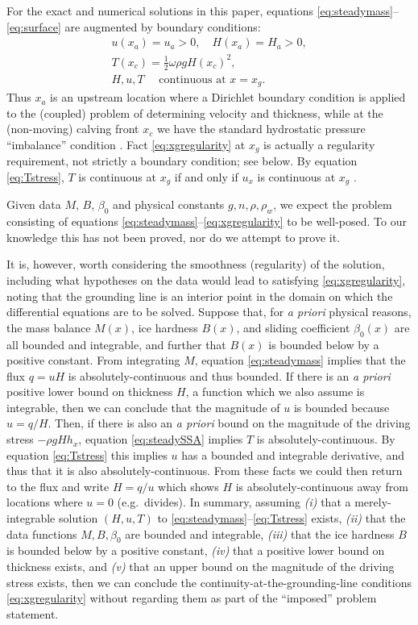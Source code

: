 \documentclass[twocolumn,letterpaper]{igs}
\begin{document}
For the exact and numerical solutions in this paper, equations \eqref{eq:steadymass}--\eqref{eq:surface} are augmented by boundary conditions:
\begin{gather}
u(x_a) = u_a > 0, \quad H(x_a) = H_a > 0, \label{eq:leftbc} \\
T(x_c) = \frac{1}{2} \omega \rho g H(x_c)^2,  \label{eq:rightbc} \\
H, u, T \quad \text{ continuous at } x = x_g.  \label{eq:xgregularity}
\end{gather}
Thus $x_a$ is an upstream location where a Dirichlet boundary condition is applied to the (coupled) problem of determining velocity and thickness, while at the (non-moving) calving front $x_c$ we have the standard hydrostatic pressure ``imbalance'' condition \citep{SchoofMarine1}.  Fact \eqref{eq:xgregularity} at $x_g$ is actually a regularity requirement, not strictly a boundary condition; see below.  By equation \eqref{eq:Tstress}, $T$ is continuous at $x_g$ if and only if $u_x$ is continuous at $x_g$ \citep{SchoofMarine1}.

Given data $M$, $B$, $\beta_0$ and physical constants $g,n,\rho,\rho_w$, we expect the problem consisting of equations \eqref{eq:steadymass}--\eqref{eq:xgregularity} to be well-posed.  To our knowledge this has not been proved, nor do we attempt to prove it.

It is, however, worth considering the smoothness (regularity) of the solution, including what hypotheses on the data would lead to satisfying \eqref{eq:xgregularity}, noting that the grounding line is an interior point in the domain on which the differential equations are to be solved.  Suppose that, for \emph{a priori} physical reasons, the mass balance $M(x)$, ice hardness $B(x)$, and sliding coefficient $\beta_0(x)$ are all bounded and integrable, and further that $B(x)$ is bounded below by a positive constant.  From integrating $M$, equation \eqref{eq:steadymass} implies that the flux $q=uH$ is absolutely-continuous and thus bounded.  If there is an \emph{a priori} positive lower bound on thickness $H$, a function which we also assume is integrable, then we can conclude that the magnitude of $u$ is bounded because $u=q/H$.  Then, if there is also an \emph{a priori} bound on the magnitude of the driving stress $-\rho g H h_x$, equation \eqref{eq:steadySSA} implies $T$ is absolutely-continuous.  By equation \eqref{eq:Tstress} this implies $u$ has a bounded and integrable derivative, and thus that it is also absolutely-continuous.  From these facts we could then return to the flux and write $H=q/u$ which shows $H$ is absolutely-continuous away from locations where $u=0$ (e.g.~divides).  In summary, assuming \emph{(i)} that a merely-integrable solution $(H,u,T)$ to \eqref{eq:steadymass}--\eqref{eq:Tstress} exists, \emph{(ii)} that the data functions $M,B,\beta_0$ are bounded and integrable, \emph{(iii)} that the ice hardness $B$ is bounded below by a positive constant, \emph{(iv)} that a positive lower bound on thickness exists, and \emph{(v)} that an upper bound on the magnitude of the driving stress exists, then we can conclude the continuity-at-the-grounding-line conditions \eqref{eq:xgregularity} without regarding them as part of the ``imposed'' problem statement.
\end{document}
